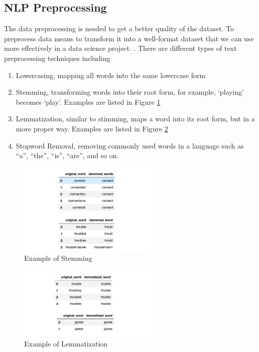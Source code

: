 \documentclass[12pt]{article}
\begin{document}
\subsection{NLP Preprocessing}
The data preprocessing is needed to get a better quality of the dataset. To preprocess data means to transform it into a well-format dataset that we can use more effectively in a data science project.   \cite{text_preprocessing_nlp}. There are different types of text preprocessing techniques including
\begin{enumerate}
  \item Lowercasing, mapping all words into the same lowercase form
  \item Stemming, transforming words into their root form, for example, ‘playing’ becomes ‘play’. Examples are listed in Figure \ref{fig:stemming}
  \item Lemmatization, similar to stimming, maps a word into its root form, but in a more proper way. Examples are listed in Figure \ref{fig:lemmatization}
  \item Stopword Removal, removing commonly used words in a language such as “a”, “the”, “is”, “are”, and so on.
\end{enumerate}


\begin{figure}
    \centering
    \includegraphics[width=0.6\textwidth]{figures/stemming.png}
    \caption{Example of Stemming}
    \label{fig:stemming}
\end{figure}

\begin{figure}
    \centering
    \includegraphics[width=0.6\textwidth]{figures/lemmatize.png}
    \caption{Example of Lemmatization}
    \label{fig:lemmatization}
\end{figure}
\end{document}
